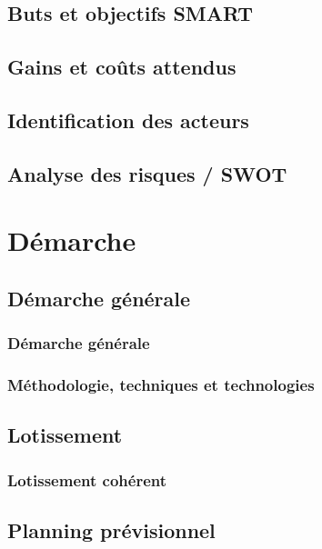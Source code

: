 \documentclass[a4paper]{article}
\begin{document}
\subsection{Buts et objectifs SMART}

\subsection{Gains et coûts attendus}

\subsection{Identification des acteurs}

\subsection{Analyse des risques / SWOT}

\newpage
\section{Démarche}

\subsection{Démarche générale}

\subsubsection{Démarche générale}

\subsubsection{Méthodologie, techniques et technologies}

\subsection{Lotissement}

\subsubsection{Lotissement cohérent}

\subsection{Planning prévisionnel}
\end{document}
